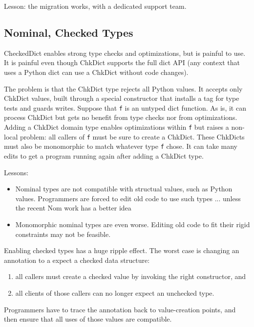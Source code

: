 \documentclass[english,cleveref,submission]{programming}
\newcommand{\code}[1]{\texttt{#1}}
\begin{document}
\noindent{}Lesson: the migration works, with a dedicated support team.


\subsection{Nominal, Checked Types}
\label{s:concrete-migration}

CheckedDict enables strong type checks and optimizations, but is painful to use.
It is painful even though ChkDict supports the full dict API
(any context that uses a Python dict can use a ChkDict without code changes).

The problem is that the ChkDict type rejects all Python values.
It accepts only ChkDict values, built through a special constructor
that installs a tag for type tests and guards writes.
Suppose that \code{f} is an untyped dict function.
As is, it can process ChkDict but gets no benefit from type checks nor from optimizations.
Adding a ChkDict domain type enables optimizations within \code{f} but raises a non-local
problem: all callers of \code{f} must be sure to create a ChkDict.
These ChkDicts must also be monomorphic to match whatever type \code{f} chose.
It can take many edits to get a program running again after adding a ChkDict type.

Lessons:
\begin{itemize}
  \item
    Nominal types are not compatible with structual values, such as Python values.
    Programmers are forced to edit old code to use such types ... unless the recent Nom work has a better idea~\cite{mt-oopsla-2021}
  \item
    Monomorphic nominal types are even worse.
    Editing old code to fit their rigid constraints may not be feasible.

\end{itemize}

Enabling checked types has a huge ripple effect.
The worst case is changing an annotation to a expect a checked data structure:
\begin{enumerate}
  \item all callers must create a checked value by invoking the right constructor, and
  \item all clients of those callers can no longer expect an unchecked type.
\end{enumerate}
Programmers have to trace the annotation back to value-creation points, and then
ensure that all uses of those values are compatible.
\end{document}
